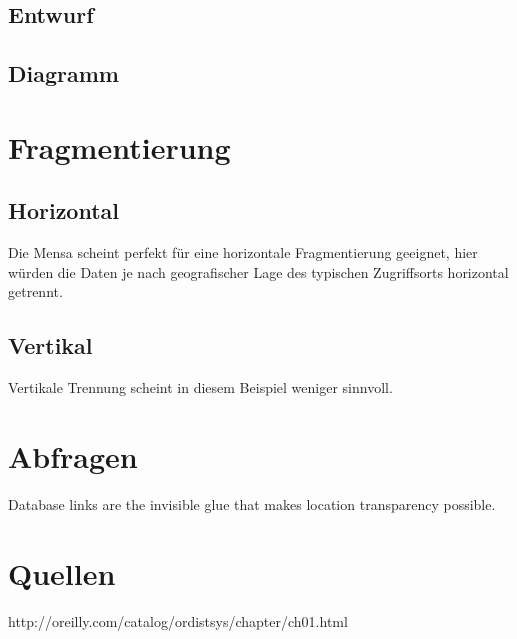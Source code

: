 \documentclass[12pt,a4paper]{report}
\begin{document}
	\section{Entwurf}
	\section{Diagramm}
	\chapter{Fragmentierung}
	\section{Horizontal}
	Die Mensa scheint perfekt für eine horizontale Fragmentierung geeignet, hier würden die Daten je nach geografischer Lage des typischen Zugriffsorts horizontal getrennt.
	\section{Vertikal}
	Vertikale Trennung scheint in diesem Beispiel weniger sinnvoll.
	\chapter{Abfragen}
	Database links are the invisible glue that makes location transparency possible.
	
	\chapter{Quellen}
	http://oreilly.com/catalog/ordistsys/chapter/ch01.html
\end{document}
